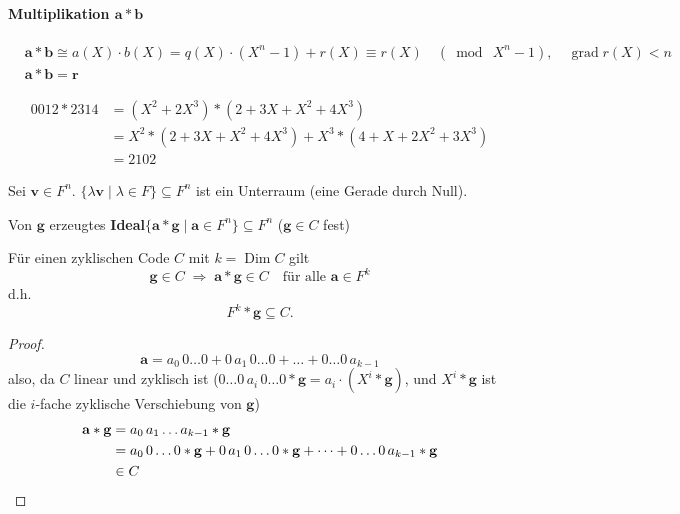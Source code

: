 \paragraph{Multiplikation $\mathbf{a} * \mathbf{b}$}
\begin{align*}
& \mathbf{a} * \mathbf{b} \cong a(X)\cdot b(X) = q(X)\cdot(X^n - 1) + r(X) \equiv r(X) \quad (\bmod\ X^n - 1), \quad \operatorname{grad} r(X) < n \\
& \mathbf{a} * \mathbf{b} = \mathbf{r}
\end{align*}

\begin{beispiel}[$F = F_5$, $n = 4$]
\begin{align*}
0012 * 2314 &= (X^2 + 2X^3) * (2 + 3X + X^2 + 4X^3) \\
&= X^2 * (2 + 3X + X^2 + 4X^3) + X^3 * (4 + X + 2X^2 + 3X^3) \\
&= 2102
\end{align*}
\end{beispiel}

Sei $\mathbf{v} \in F^n$. $\{\lambda \mathbf{v} \mid \lambda \in F\} \subseteq F^n$ ist ein Unterraum (eine Gerade durch Null).

Von $\mathbf{g}$ erzeugtes \textbf{Ideal}\quad $\{\mathbf{a} * \mathbf{g} \mid \mathbf{a} \in F^n\} \subseteq F^n$ \qquad ($\mathbf{g} \in C$ fest)

\begin{satz}
Für einen zyklischen Code $C$ mit $k = \operatorname{Dim} C$ gilt
\[
\mathbf{g} \in C \;\Rightarrow\; \mathbf{a} * \mathbf{g} \in C \quad \text{für alle } \mathbf{a} \in F^k
\]
d.h.
\[
F^k * \mathbf{g} \subseteq C.
\]
\end{satz}

\begin{proof}
\[
\mathbf{a} = a_0\, 0\dots0 + 0\, a_1\, 0\dots0 + \dots + 0\dots0\, a_{k-1}
\]
also, da $C$ linear und zyklisch ist ($0\dots0\, a_i\, 0\dots0 * \mathbf{g} = a_i \cdot (X^i * \mathbf{g})$, und $X^i * \mathbf{g}$ ist die $i$-fache zyklische Verschiebung von $\mathbf{g}$)
\begin{align*}
\mathbf{a} * \mathbf{g} &= a_0\, a_1 \dots a_{k-1} * \mathbf{g} \\
&= a_0\, 0\dots0 * \mathbf{g} + 0\, a_1\, 0\dots0 * \mathbf{g} + \dots + 0\dots0\, a_{k-1} * \mathbf{g} \\
&\in C \qedhere
\end{align*}
\end{proof}

